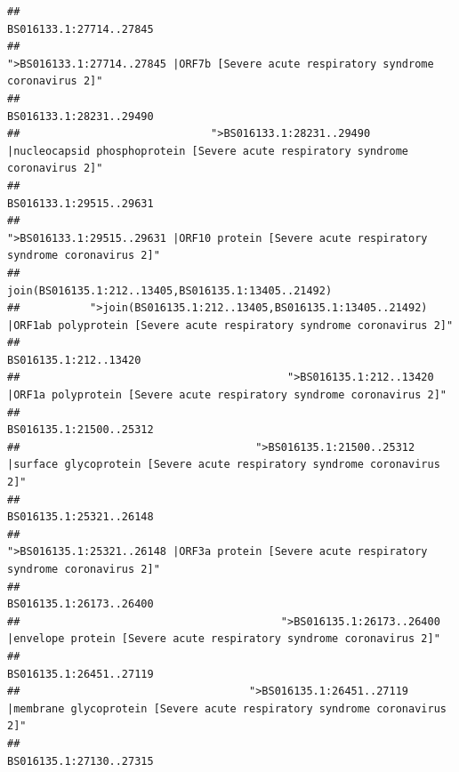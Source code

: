 \documentclass[
]{article}
\begin{document}
\begin{verbatim}
##                                                                                                                BS016133.1:27714..27845 
##                                                    ">BS016133.1:27714..27845 |ORF7b [Severe acute respiratory syndrome coronavirus 2]" 
##                                                                                                                BS016133.1:28231..29490 
##                              ">BS016133.1:28231..29490 |nucleocapsid phosphoprotein [Severe acute respiratory syndrome coronavirus 2]" 
##                                                                                                                BS016133.1:29515..29631 
##                                            ">BS016133.1:29515..29631 |ORF10 protein [Severe acute respiratory syndrome coronavirus 2]" 
##                                                                                    join(BS016135.1:212..13405,BS016135.1:13405..21492) 
##           ">join(BS016135.1:212..13405,BS016135.1:13405..21492) |ORF1ab polyprotein [Severe acute respiratory syndrome coronavirus 2]" 
##                                                                                                                  BS016135.1:212..13420 
##                                          ">BS016135.1:212..13420 |ORF1a polyprotein [Severe acute respiratory syndrome coronavirus 2]" 
##                                                                                                                BS016135.1:21500..25312 
##                                     ">BS016135.1:21500..25312 |surface glycoprotein [Severe acute respiratory syndrome coronavirus 2]" 
##                                                                                                                BS016135.1:25321..26148 
##                                            ">BS016135.1:25321..26148 |ORF3a protein [Severe acute respiratory syndrome coronavirus 2]" 
##                                                                                                                BS016135.1:26173..26400 
##                                         ">BS016135.1:26173..26400 |envelope protein [Severe acute respiratory syndrome coronavirus 2]" 
##                                                                                                                BS016135.1:26451..27119 
##                                    ">BS016135.1:26451..27119 |membrane glycoprotein [Severe acute respiratory syndrome coronavirus 2]" 
##                                                                                                                BS016135.1:27130..27315 

\end{verbatim}
\end{document}
